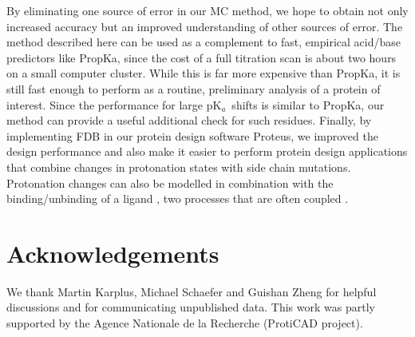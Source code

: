 \documentclass[a4paper,12pt]{article}
\newcommand{\pk}{pK$_a$}
\begin{document}
By eliminating one source of error in our MC method, we hope to obtain not only increased accuracy but an improved
understanding of other sources of error. The method described here can be used as a complement to fast, empirical acid/base
predictors like PropKa, since the cost of a full titration scan is about two hours on a small computer cluster. While this is
far more expensive than PropKa, it is still fast enough to perform as a routine, preliminary analysis of a protein of interest.
Since the performance for large \pk\ shifts is similar to PropKa, our method can provide a useful additional check for such
residues. Finally, by implementing FDB in our protein design software Proteus, we improved the design performance and also
make it easier to perform protein design applications that combine changes in protonation states with side chain mutations.
Protonation changes can also be modelled in combination with the binding/unbinding of a ligand \cite{Druart16}, two processes
that are often coupled \cite{Onufriev13}. 

\section*{Acknowledgements}
We thank Martin Karplus, Michael Schaefer and Guishan Zheng for helpful discussions and for communicating unpublished data.
This work was partly supported by the Agence Nationale de la Recherche (ProtiCAD project).

\small 

%
\normalsize
\clearpage

\end{document}
